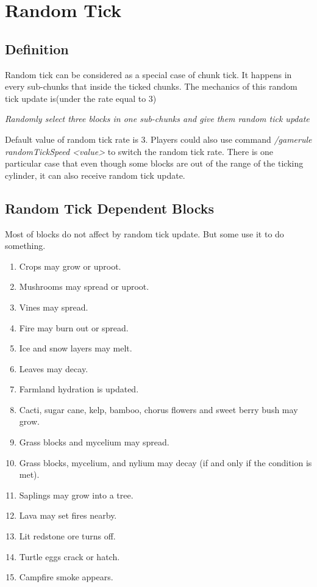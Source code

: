 \documentclass[UTF8,a4paper,15pt,titlepage,scale=0.8]{article}
\begin{document}
\section{Random Tick}
    \subsection{Definition}
        Random tick can be considered as a special case of chunk tick. It happens in every sub-chunks that inside the ticked chunks. The mechanics of this random tick update is(under the rate equal to 3)
            \begin{center}
                \textit{Randomly select three blocks in one sub-chunks and give them random tick update}
            \end{center}
        Default value of random tick rate is 3. Players could also use command \textit{/gamerule randomTickSpeed <value>} to switch the random tick rate. There is one particular case that even though some blocks are out of the range of the ticking cylinder, it can also receive random tick update.
    \subsection{Random Tick Dependent Blocks}
        Most of blocks do not affect by random tick update. But some use it to do something\cite{ref1}. 
            \begin{enumerate}[$\cdot$]
                \item Crops may grow or uproot.
                \item Mushrooms may spread or uproot.
                \item Vines may spread.
                \item Fire may burn out or spread.
                \item Ice and snow layers may melt.
                \item Leaves may decay.
                \item Farmland hydration is updated.
                \item Cacti, sugar cane, kelp, bamboo, chorus flowers and sweet berry bush may grow.
                \item Grass blocks and mycelium may spread.
                \item Grass blocks, mycelium, and nylium may decay (if and only if the condition is met).
                \item Saplings may grow into a tree.
                \item Lava may set fires nearby.
                \item Lit redstone ore turns off.
                \item Turtle eggs crack or hatch.
                \item Campfire smoke appears.
            \end{enumerate}
\end{document}
